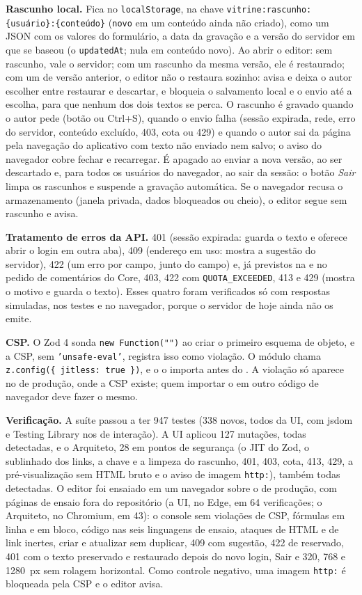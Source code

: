 \textbf{Rascunho local.} Fica no \texttt{localStorage}, na chave \texttt{vitrine:rascunho:\{usuário\}:\{conteúdo\}} (\texttt{novo} em um conteúdo ainda não criado), como um JSON com os valores do formulário, a data da gravação e a versão do servidor em que se baseou (o \texttt{updatedAt}; nula em conteúdo novo). Ao abrir o editor: sem rascunho, vale o servidor; com um rascunho da mesma versão, ele é restaurado; com um de versão anterior, o editor não o restaura sozinho: avisa e deixa o autor escolher entre restaurar e descartar, e bloqueia o salvamento local e o envio até a escolha, para que nenhum dos dois textos se perca. O rascunho é gravado quando o autor pede (botão ou Ctrl+S), quando o envio falha (sessão expirada, rede, erro do servidor, conteúdo excluído, 403, cota ou 429) e quando o autor sai da página pela navegação do aplicativo com texto não enviado nem salvo; o aviso do navegador cobre fechar e recarregar. É apagado ao enviar a nova versão, ao ser descartado e, para todos os usuários do navegador, ao sair da sessão: o botão \emph{Sair} limpa os rascunhos e suspende a gravação automática. Se o navegador recusa o armazenamento (janela privada, dados bloqueados ou cheio), o editor segue sem rascunho e avisa.

\textbf{Tratamento de erros da API.} 401 (sessão expirada: guarda o texto e oferece abrir o login em outra aba), 409 (endereço em uso: mostra a sugestão do servidor), 422 (um erro por campo, junto do campo) e, já previstos na  e no pedido de comentários do Core, 403, 422 com \texttt{QUOTA\_EXCEEDED}, 413 e 429 (mostra o motivo e guarda o texto). Esses quatro foram verificados só com respostas simuladas, nos testes e no navegador, porque o servidor de hoje ainda não os emite.

\textbf{CSP.} O Zod 4 sonda \texttt{new Function("")} ao criar o primeiro esquema de objeto, e a CSP, sem \texttt{'unsafe-eval'}, registra isso como violação. O módulo  chama \texttt{z.config(\{ jitless: true \})}, e o  o importa antes do . A violação só aparece no  de produção, onde a CSP existe; quem importar o  em outro código de navegador deve fazer o mesmo.

\textbf{Verificação.} A suíte passou a ter 947 testes (338 novos, todos da UI, com jsdom e Testing Library nos de interação). A UI aplicou 127 mutações, todas detectadas, e o Arquiteto, 28 em pontos de segurança (o JIT do Zod, o sublinhado dos links, a chave e a limpeza do rascunho, 401, 403, cota, 413, 429, a pré-visualização sem HTML bruto e o aviso de imagem \texttt{http:}), também todas detectadas. O editor foi ensaiado em um navegador sobre o  de produção, com páginas de ensaio fora do repositório (a UI, no Edge, em 64 verificações; o Arquiteto, no Chromium, em 43): o console sem violações de CSP, fórmulas em linha e em bloco, código nas seis linguagens de ensaio, ataques de HTML e de link inertes, criar e atualizar sem duplicar, 409 com sugestão, 422 de  reservado, 401 com o texto preservado e restaurado depois do novo login, Sair e 320, 768 e 1280~px sem rolagem horizontal. Como controle negativo, uma imagem \texttt{http:} é bloqueada pela CSP e o editor avisa.

